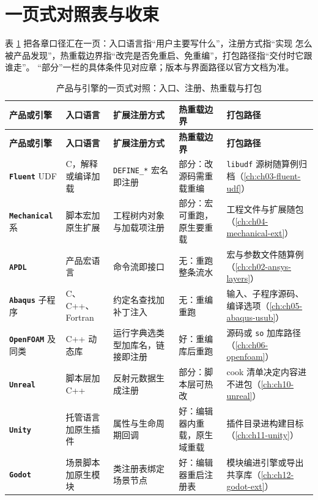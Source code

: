 \documentclass[12pt,a4paper,fontset=fandol]{ctexbook}
\newcommand{\Tp}[1]{\texttt{#1}}
\newcommand{\Lib}[1]{\textbf{\texttt{#1}}}
\newcommand{\Lang}[1]{\textsf{#1}}
\newcommand{\CL}{\Lang{C}}
\newcommand{\CPP}{\Lang{C++}}
\begin{document}
\section{一页式对照表与收束}
\label{sec:ch18-onepage}

表 \ref{tab:ch18-onepage} 把各章口径汇在一页：入口语言指``用户主要写什么''，注册方式指``实现
怎么被产品发现''，热重载边界指``改完是否免重启、免重编''，打包路径指``交付时它跟谁走''。
``部分''一栏的具体条件见对应章；版本与界面路径以官方文档为准。

\begingroup\footnotesize
\begin{longtable}{>{\raggedright\arraybackslash}p{}
                 >{\raggedright\arraybackslash}p{}
                 >{\raggedright\arraybackslash}p{}
                 >{\raggedright\arraybackslash}p{}
                 >{\raggedright\arraybackslash}p{}}
\caption{产品与引擎的一页式对照：入口、注册、热重载与打包}\label{tab:ch18-onepage}\\
\toprule
\textbf{产品或引擎} & \textbf{入口语言} & \textbf{扩展注册方式} & \textbf{热重载边界} &
\textbf{打包路径} \\
\midrule
\endfirsthead
\toprule
\textbf{产品或引擎} & \textbf{入口语言} & \textbf{扩展注册方式} & \textbf{热重载边界} &
\textbf{打包路径} \\
\midrule
\endhead
\midrule
\endfoot
\bottomrule
\endlastfoot
\Lib{Fluent} UDF & \CL{}，解释或编译加载 & \Tp{DEFINE\_*} 宏名即注册 & 部分：改源码需重载重编 & \Tp{libudf} 源树随算例归档（\ref{ch:ch03-fluent-udf}） \\
\Lib{Mechanical} 系 & 脚本宏加原生扩展 & 工程树内对象与加载项注册 & 部分：宏可重跑，原生要重载 & 工程文件与扩展随包（\ref{ch:ch04-mechanical-ext}） \\
\Lib{APDL} & 产品宏语言 & 命令流即接口 & 无：重跑整条流水 & 宏与参数文件随算例（\ref{ch:ch02-ansys-layers}） \\
\Lib{Abaqus} 子程序 & \CL、\CPP、\Lang{Fortran} & 约定名查找加补丁注入 & 无：重编重跑 & 输入、子程序源码、编译选项（\ref{ch:ch05-abaqus-usub}） \\
\Lib{OpenFOAM} 及同类 & \CPP{} 动态库 & 运行字典选类型加库名，链接即注册 & 好：重编库后重跑 & 源码或 \Tp{so} 加库路径（\ref{ch:ch06-openfoam}） \\
\Lib{Unreal} & 脚本层加 \CPP & 反射元数据生成注册 & 部分：脚本层可热改 & cook 清单决定内容进不进包（\ref{ch:ch10-unreal}） \\
\Lib{Unity} & 托管语言加原生插件 & 属性与生命周期回调 & 好：编辑器内重载，原生域重载 & 插件目录进构建目标（\ref{ch:ch11-unity}） \\
\Lib{Godot} & 场景脚本加原生模块 & 类注册表绑定场景节点 & 好：编辑器重启注册表 & 模块编进引擎或导出共享库（\ref{ch:ch12-godot-ext}） \\
\end{longtable}
\endgroup
\end{document}
